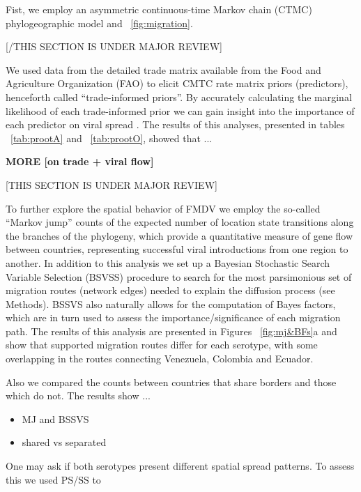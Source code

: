 \documentclass[10pt]{article}
\begin{document}
Fist, we employ an asymmetric continuous-time Markov chain (CTMC) phylogeographic model \cite{roots}  and ~\ref{fig:migration}.

\begin{center}
 [/THIS SECTION IS UNDER MAJOR REVIEW]
\end{center}

We used data from the detailed trade matrix available from the Food and Agriculture Organization (FAO) to elicit CMTC rate matrix priors (predictors), henceforth called ``trade-informed priors''. By accurately calculating the marginal likelihood of each trade-informed prior we can gain insight into the importance of each predictor on viral spread \cite{Carvalho2012,Nelson2011}. The results of this analyses, presented in tables ~\ref{tab:prootA} and ~\ref{tab:prootO}, showed that ...

{{\bf MORE [on trade + viral flow]}}

\begin{center}
 [THIS SECTION IS UNDER MAJOR REVIEW]
\end{center}

To further explore the spatial behavior of FMDV we employ the so-called ``Markov jump'' counts \cite{Minin2008} of the expected number of location state transitions along the  branches of the phylogeny, which  provide a quantitative measure of gene flow between countries, representing successful viral introductions from one region to another. In addition to this analysis we set up a Bayesian Stochastic Search Variable Selection (BSVSS) procedure to search for the most parsimonious set of migration routes (network edges) needed to explain the diffusion process (see Methods). BSSVS also naturally allows for the computation of Bayes factors, which are in turn used to assess the importance/significance of each migration path. The results of this analysis are presented in Figures ~\ref{fig:mj&BFs}a and show that supported migration routes differ for each serotype, with some overlapping in the routes connecting Venezuela, Colombia and Ecuador. 

Also we compared the counts between countries that share borders and those which do not. The results show ... %
\begin{itemize}
 \item MJ and BSSVS
 \item shared vs separated
\end{itemize}

One may ask if both serotypes present different spatial spread patterns. To assess this we used PS/SS to 
\end{document}
